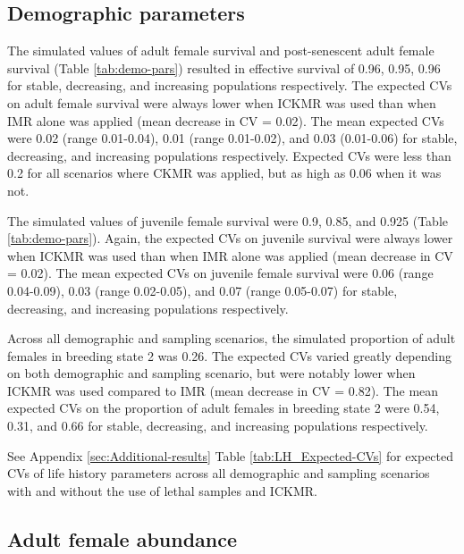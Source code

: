 
\subsection{Demographic parameters}

The simulated values of adult female survival and post-senescent adult
female survival (Table \ref{tab:demo-pars}) resulted in effective
survival of 0.96, 0.95, 0.96 for stable, decreasing, and increasing
populations respectively. The expected CVs on adult female survival
were always lower when ICKMR was used than when IMR alone was applied
(mean decrease in CV = 0.02). The mean expected CVs were 0.02 (range
0.01-0.04), 0.01 (range 0.01-0.02), and 0.03 (0.01-0.06) for stable,
decreasing, and increasing populations respectively. Expected CVs
were less than 0.2 for all scenarios where CKMR was applied, but as
high as 0.06 when it was not. 

The simulated values of juvenile female survival were 0.9, 0.85, and
0.925 (Table \ref{tab:demo-pars}). Again, the expected CVs on juvenile
survival were always lower when ICKMR was used than when IMR alone
was applied (mean decrease in CV = 0.02). The mean expected CVs on
juvenile female survival were 0.06 (range 0.04-0.09), 0.03 (range
0.02-0.05), and 0.07 (range 0.05-0.07) for stable, decreasing, and
increasing populations respectively.

Across all demographic and sampling scenarios, the simulated proportion
of adult females in breeding state 2 was 0.26. The expected CVs varied
greatly depending on both demographic and sampling scenario, but were
notably lower when ICKMR was used compared to IMR (mean decrease in
CV = 0.82). The mean expected CVs on the proportion of adult females
in breeding state 2 were 0.54, 0.31, and 0.66 for stable, decreasing,
and increasing populations respectively.

See Appendix \ref{sec:Additional-results} Table \ref{tab:LH_Expected-CVs}
for expected CVs of life history parameters across all demographic
and sampling scenarios with and without the use of lethal samples
and ICKMR.

\subsection{Adult female abundance}

